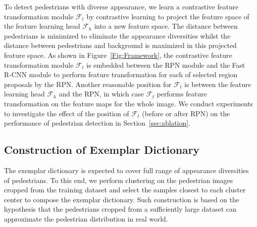 \documentclass[journal]{IEEEtran}
\begin{document}
To detect pedestrians with diverse appearance, we learn a contrastive feature transformation module $\mathcal{F}_t$ by contrastive learning to project the feature space of the feature learning head $\mathcal{F}_h$ into a new feature space. The distance between pedestrians is minimized to eliminate the appearance diversities whilst the distance between pedestrians and background is maximized in this projected feature space.  As shown in Figure~\ref{Fig:Framework}, the contrastive feature transformation module $\mathcal{F}_t$ is embedded between the RPN module and the Fast R-CNN module to perform feature transformation for each of selected region proposals by the RPN. Another reasonable position for $\mathcal{F}_t$ is between the feature learning head $\mathcal{F}_h$ and the RPN, in which case $\mathcal{F}_t$ performs feature transformation on the feature maps for the whole image. We conduct experiments to investigate the effect of the position of $\mathcal{F}_t$ (before or after RPN) on the performance of pedestrian detection in Section~\ref{sec:ablation}.



\vspace{-8pt}
\subsection{Construction of Exemplar Dictionary}
\label{exemplar construction}
The exemplar dictionary is expected to cover full range of appearance diversities of pedestrians. To this end, we perform clustering on the pedestrian images cropped from the training dataset and select the samples closest to each cluster center to compose the exemplar dictionary. Such construction is based on the hypothesis that the pedestrians cropped from a sufficiently large dataset can approximate the pedestrian distribution in real world. 
\end{document}
